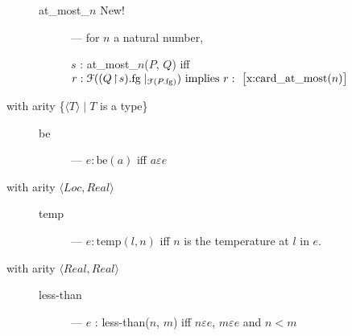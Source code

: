 \begin{description}
\begin{description}

      
    \item[\textnormal{at\_most\_$n$} New!] --- for $n$ a natural
      number,

      $s$ : at\_most\_$n$($P$, $Q$) iff
          $r:\mathcal{F}((Q\!\restriction\!        s).\text{fg}\mid_{\mathcal{F}(P.\text{fg})})
        \text{ implies } r:\text{ \smallrecord{\smalltfield{x}{card\_at\_most($n$)}}}$


\end{description}    

  
\item[with arity \textnormal{\{$\langle T\rangle\mid T$ is a type\}}]
  \mbox{}

  \begin{description}
    
  \item[\textnormal{be}] --- $e:\text{be}(a)$ iff $a\varepsilon e$

  \end{description}

  
\item[with arity
  \textnormal{$\langle\textit{Loc},\textit{Real}\rangle$}] \mbox{}
  \begin{description}
    
  \item[\textnormal{temp}] --- $e:\text{temp}(l,n)$ iff $n$ is
    the temperature at $l$ in $e$.

    
  

  \end{description}
  
\item[with arity
  \textnormal{$\langle\textit{Real},\textit{Real}\rangle$}] \mbox{}

  \begin{description}
    
  \item[\textnormal{less-than}] --- $e$ : less-than($n$, $m$) iff $n\varepsilon e$, $m\varepsilon e$ and $n<m$


\end{description}
\end{description}
